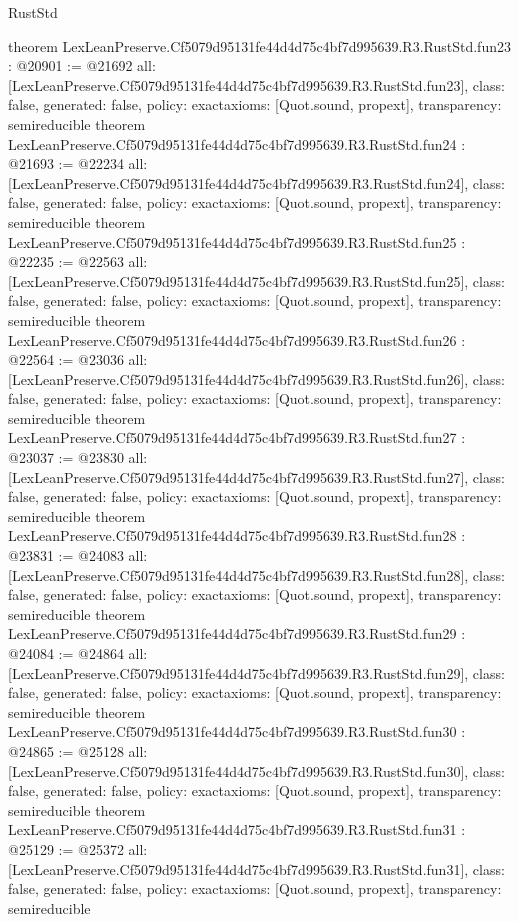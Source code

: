 \begin{lexlean}{RustStd}
\begin{coremodule}
{}
theorem LexLeanPreserve.Cf5079d95131fe44d4d75c4bf7d995639.R3.RustStd.fun23 : @20901 := @21692 {
  all: [LexLeanPreserve.Cf5079d95131fe44d4d75c4bf7d995639.R3.RustStd.fun23],
  class: false,
  generated: false,
  policy: exact{axioms: [Quot.sound, propext]},
  transparency: semireducible
}
theorem LexLeanPreserve.Cf5079d95131fe44d4d75c4bf7d995639.R3.RustStd.fun24 : @21693 := @22234 {
  all: [LexLeanPreserve.Cf5079d95131fe44d4d75c4bf7d995639.R3.RustStd.fun24],
  class: false,
  generated: false,
  policy: exact{axioms: [Quot.sound, propext]},
  transparency: semireducible
}
theorem LexLeanPreserve.Cf5079d95131fe44d4d75c4bf7d995639.R3.RustStd.fun25 : @22235 := @22563 {
  all: [LexLeanPreserve.Cf5079d95131fe44d4d75c4bf7d995639.R3.RustStd.fun25],
  class: false,
  generated: false,
  policy: exact{axioms: [Quot.sound, propext]},
  transparency: semireducible
}
theorem LexLeanPreserve.Cf5079d95131fe44d4d75c4bf7d995639.R3.RustStd.fun26 : @22564 := @23036 {
  all: [LexLeanPreserve.Cf5079d95131fe44d4d75c4bf7d995639.R3.RustStd.fun26],
  class: false,
  generated: false,
  policy: exact{axioms: [Quot.sound, propext]},
  transparency: semireducible
}
theorem LexLeanPreserve.Cf5079d95131fe44d4d75c4bf7d995639.R3.RustStd.fun27 : @23037 := @23830 {
  all: [LexLeanPreserve.Cf5079d95131fe44d4d75c4bf7d995639.R3.RustStd.fun27],
  class: false,
  generated: false,
  policy: exact{axioms: [Quot.sound, propext]},
  transparency: semireducible
}
theorem LexLeanPreserve.Cf5079d95131fe44d4d75c4bf7d995639.R3.RustStd.fun28 : @23831 := @24083 {
  all: [LexLeanPreserve.Cf5079d95131fe44d4d75c4bf7d995639.R3.RustStd.fun28],
  class: false,
  generated: false,
  policy: exact{axioms: [Quot.sound, propext]},
  transparency: semireducible
}
theorem LexLeanPreserve.Cf5079d95131fe44d4d75c4bf7d995639.R3.RustStd.fun29 : @24084 := @24864 {
  all: [LexLeanPreserve.Cf5079d95131fe44d4d75c4bf7d995639.R3.RustStd.fun29],
  class: false,
  generated: false,
  policy: exact{axioms: [Quot.sound, propext]},
  transparency: semireducible
}
theorem LexLeanPreserve.Cf5079d95131fe44d4d75c4bf7d995639.R3.RustStd.fun30 : @24865 := @25128 {
  all: [LexLeanPreserve.Cf5079d95131fe44d4d75c4bf7d995639.R3.RustStd.fun30],
  class: false,
  generated: false,
  policy: exact{axioms: [Quot.sound, propext]},
  transparency: semireducible
}
theorem LexLeanPreserve.Cf5079d95131fe44d4d75c4bf7d995639.R3.RustStd.fun31 : @25129 := @25372 {
  all: [LexLeanPreserve.Cf5079d95131fe44d4d75c4bf7d995639.R3.RustStd.fun31],
  class: false,
  generated: false,
  policy: exact{axioms: [Quot.sound, propext]},
  transparency: semireducible
}
\end{coremodule}
\end{lexlean}
